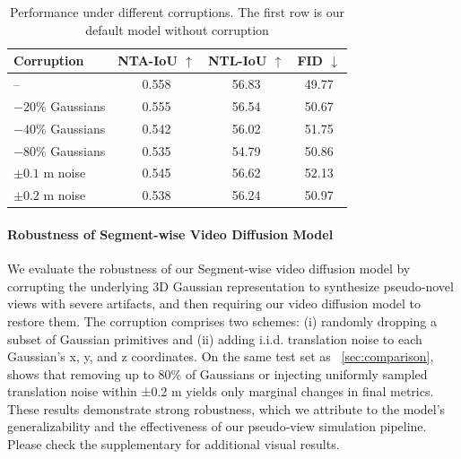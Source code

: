 \begin{table}[t]
  \centering
  \small
  \setlength{\tabcolsep}{6pt} %
  \begin{tabular}{lccc}
    \toprule
    Corruption & NTA-IoU $\uparrow$ & NTL-IoU $\uparrow$ & FID $\downarrow$ \\
    \midrule
    --                 & 0.558 & 56.83 & 49.77 \\
    $-20\%$ Gaussians  & 0.555 & 56.54 & 50.67 \\
    $-40\%$ Gaussians  & 0.542 & 56.02 & 51.75 \\
    $-80\%$ Gaussians  & 0.535 & 54.79 & 50.86 \\
    $\pm 0.1$ m noise  & 0.545 & 56.62 & 52.13 \\
    $\pm 0.2$ m noise  & 0.538 & 56.24 & 50.97 \\
    \bottomrule
  \end{tabular}
  \vspace{-0.1in}
  \caption{Performance under different corruptions. The first row is our default model without corruption}
  \label{tab:corruption_table}
  \vspace{-0.2in}
\end{table}

\paragraph{Robustness of Segment-wise Video Diffusion Model}
We evaluate the robustness of our Segment‑wise video diffusion model by corrupting the underlying 3D Gaussian representation to synthesize pseudo‑novel views with severe artifacts, and then requiring our video diffusion model to restore them. The corruption comprises two schemes: (i) randomly dropping a subset of Gaussian primitives and (ii) adding i.i.d. translation noise to each Gaussian’s x, y, and z coordinates. On the same test set as ~\cref{sec:comparison}, ~ shows that removing up to 80\% of Gaussians or injecting uniformly sampled translation noise within ±0.2 m yields only marginal changes in final metrics.
These results demonstrate strong robustness, which we attribute to the model’s generalizability and the effectiveness of our pseudo‑view simulation pipeline. Please check the supplementary for additional visual results.





